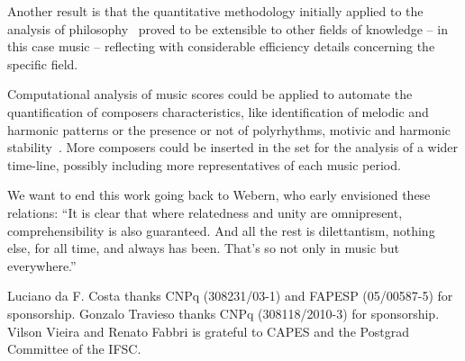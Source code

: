 \documentclass[
 aip,
 jmp,
 amsmath,amssymb,
 reprint,
]{revtex4-1}
\begin{document}
Another result is that the quantitative methodology initially applied to the analysis of philosophy~\cite{Fabbri}
proved to be extensible to other fields of knowledge -- in this case music --
reflecting with considerable efficiency details concerning the specific field. 

Computational analysis of music scores could be
applied to automate the quantification of composers characteristics, like
identification of melodic and harmonic patterns or the presence or not of
polyrhythms, motivic and harmonic stability~\cite{Correa}. More composers could be
inserted in the set for the analysis of a wider time-line, possibly
including more representatives of each music period.


We want to end this work going back to Webern,
who early envisioned these relations: ``It is clear that where relatedness and unity are omnipresent,
comprehensibility is also guaranteed. And all the rest is
dilettantism, nothing else, for all time, and always has been. That's
so not only in music but everywhere.''

\begin{acknowledgments}
Luciano da F. Costa thanks CNPq (308231/03-1) and FAPESP (05/00587-5)
for sponsorship. Gonzalo Travieso thanks CNPq (308118/2010-3) for sponsorship. 
Vilson Vieira and Renato Fabbri is grateful to CAPES and 
the Postgrad Committee of the IFSC.
\end{acknowledgments}

\nocite{*}

\end{document}
